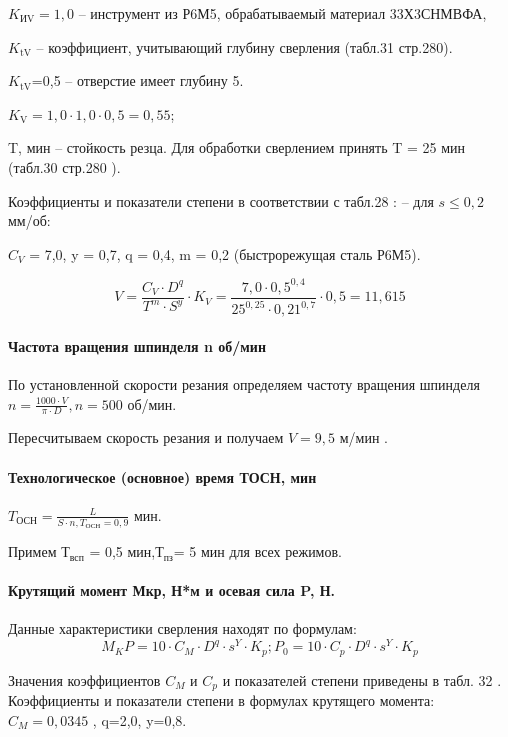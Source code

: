 $K_\text{ИV} = 1,0$ – инструмент из Р6М5, обрабатываемый материал 33Х3СНМВФА,

$K_\text{tV}$  – коэффициент, учитывающий глубину сверления (табл.31 стр.280\cite{TECHNO}).

$K_\text{tV} $=0,5 – отверстие имеет глубину 5.

$K_\text{V} = 1,0 \cdot 1,0 \cdot 0,5 = 0,55$;

T, мин – стойкость резца.  Для обработки сверлением принять  T = 25 мин (табл.30 стр.280 \cite{TECHNO}).

Коэффициенты и показатели степени в соответствии с табл.28 \cite{TECHNO}:
– для $s \le 0,2 $    мм/об:

$C_V$ = 7,0, y = 0,7, q = 0,4, m = 0,2 (быстрорежущая сталь Р6М5).

$$ V = \dfrac{ C_V \cdot D^q} {T^m \cdot S^y} \cdot K_V = \dfrac{7,0 \cdot 0,5^{0,4}}{25^{0,25} \cdot 0,21^{0,7}} \cdot 0,5 = 11,615 $$
 
\paragraph{Частота вращения шпинделя n об/мин}
По установленной скорости резания определяем частоту вращения шпинделя
 $n = \frac{1000 \cdot V}{\pi \cdot D}, n = 500 $ об/мин.

Пересчитываем скорость резания и получаем $V = 9,5$ м/мин .

\paragraph{Технологическое (основное) время  ТОСН, мин}

$ T_\text{ОСН} = \frac{L}{S\cdot n, T_\text{ОСН} = 0,9 } $ мин.

Примем $Т_\text{всп}$ = 0,5 мин,$ Т_\text{пз} $= 5  мин для всех режимов.

\paragraph{Крутящий момент Мкр, Н*м и осевая сила  P, Н.}

Данные характеристики сверления находят по формулам:
$$M_KP = 10 \cdot C_M \cdot D^q \cdot s^Y \cdot K_p ; P_0 = 10 \cdot C_p \cdot D^q \cdot s^Y \cdot K_p$$

Значения коэффициентов $C_M$  и $C_p$  и показателей степени приведены в табл. 32 \cite{TECHNO}. Коэффициенты и показатели степени в формулах крутящего момента: $C_M = 0,0345$ , q=2,0, y=0,8.

